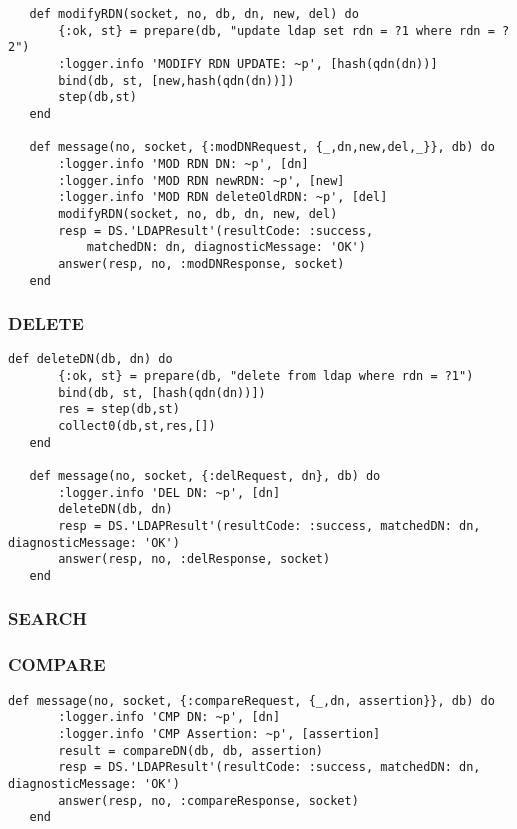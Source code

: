 \begin{lstlisting}
   def modifyRDN(socket, no, db, dn, new, del) do
       {:ok, st} = prepare(db, "update ldap set rdn = ?1 where rdn = ?2")
       :logger.info 'MODIFY RDN UPDATE: ~p', [hash(qdn(dn))]
       bind(db, st, [new,hash(qdn(dn))])
       step(db,st)
   end

   def message(no, socket, {:modDNRequest, {_,dn,new,del,_}}, db) do
       :logger.info 'MOD RDN DN: ~p', [dn]
       :logger.info 'MOD RDN newRDN: ~p', [new]
       :logger.info 'MOD RDN deleteOldRDN: ~p', [del]
       modifyRDN(socket, no, db, dn, new, del)
       resp = DS.'LDAPResult'(resultCode: :success,
           matchedDN: dn, diagnosticMessage: 'OK')
       answer(resp, no, :modDNResponse, socket)
   end
\end{lstlisting}

\subsubsection{DELETE}

\begin{lstlisting}
def deleteDN(db, dn) do
       {:ok, st} = prepare(db, "delete from ldap where rdn = ?1")
       bind(db, st, [hash(qdn(dn))])
       res = step(db,st)
       collect0(db,st,res,[])
   end

   def message(no, socket, {:delRequest, dn}, db) do
       :logger.info 'DEL DN: ~p', [dn]
       deleteDN(db, dn)
       resp = DS.'LDAPResult'(resultCode: :success, matchedDN: dn, diagnosticMessage: 'OK')
       answer(resp, no, :delResponse, socket)
   end
\end{lstlisting}

\subsubsection{SEARCH}

\subsubsection{COMPARE}

\begin{lstlisting}
def message(no, socket, {:compareRequest, {_,dn, assertion}}, db) do
       :logger.info 'CMP DN: ~p', [dn]
       :logger.info 'CMP Assertion: ~p', [assertion]
       result = compareDN(db, db, assertion)
       resp = DS.'LDAPResult'(resultCode: :success, matchedDN: dn, diagnosticMessage: 'OK')
       answer(resp, no, :compareResponse, socket)
   end
\end{lstlisting}

